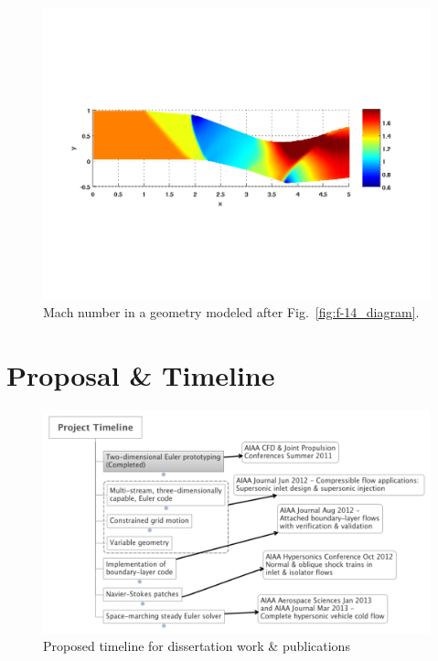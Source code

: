 \documentclass[12pt,letterpaper]{article}
\begin{document}
\begin{figure}[htbp]
   \centering
   \includegraphics[width=\textwidth]{F_14_filmstrip_5clean.pdf}
   \caption[Mach Number in F-14 Inlet]{Mach number in a geometry modeled after Fig.~\ref{fig:f-14_diagram}.}
   \label{fig:f-14_flow}
\end{figure}


\section{Proposal \& Timeline}
\label{sec:timeline}
\begin{figure}[htbp]
   \centering
   \includegraphics[width=\textwidth]{Timeline.pdf}
  \caption[Proposed Timeline for Dissertation Work and
  Publications]{Proposed timeline for dissertation work \&
    publications} 
   \label{fig:dissertation_timeline}
\end{figure}
\end{document}
